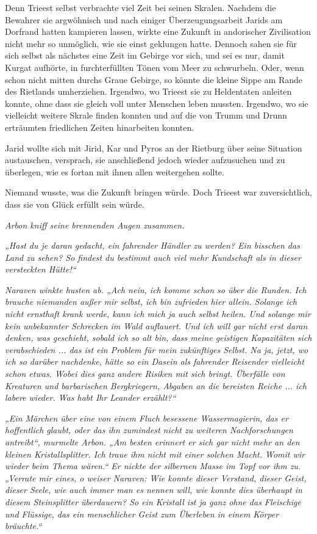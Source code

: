 Denn Trieest selbst verbrachte viel Zeit bei seinen Skralen. Nachdem die Bewahrer sie argwöhnisch und nach einiger Überzeugungsarbeit Jarids am Dorfrand hatten kampieren lassen, wirkte eine Zukunft in andorischer Zivilisation nicht mehr so unmöglich, wie sie einst geklungen hatte. Dennoch sahen sie für sich selbst als nächstes eine Zeit im Gebirge vor sich, und sei es nur, damit Kurgat aufhörte, in furchterfüllten Tönen vom Meer zu schwurbeln. Oder, wenn schon nicht mitten durchs Graue Gebirge, so könnte die kleine Sippe am Rande des Rietlands umherziehen. Irgendwo, wo Trieest sie zu Heldentaten anleiten konnte, ohne dass sie gleich voll unter Menschen leben mussten. Irgendwo, wo sie vielleicht weitere Skrale finden konnten und auf die von Trumm und Drunn erträumten friedlichen Zeiten hinarbeiten konnten.

Jarid wollte sich mit Jirid, Kar und Pyros an der Rietburg über seine Situation austauschen, versprach, sie anschließend jedoch wieder aufzusuchen und zu überlegen, wie es fortan mit ihnen allen weitergehen sollte.

Niemand wusste, was die Zukunft bringen würde. Doch Trieest war zuversichtlich, dass sie von Glück erfüllt sein würde.



\trennzeichen



\textit{Arbon kniff seine brennenden Augen zusammen.}

\textit{„Hast du je daran gedacht, ein fahrender Händler zu werden? Ein bisschen das Land zu sehen? So findest du bestimmt auch viel mehr Kundschaft als in dieser versteckten Hütte!“}

\textit{Naraven winkte husten ab. „Ach nein, ich komme schon so über die Runden. Ich brauche niemanden außer mir selbst, ich bin zufrieden hier allein. Solange ich nicht ernsthaft krank werde, kann ich mich ja auch selbst heilen. Und solange mir kein unbekannter Schrecken im Wald auflauert. Und ich will gar nicht erst daran denken, was geschieht, sobald ich so alt bin, dass meine geistigen Kapazitäten sich verabschieden ... das ist ein Problem für mein zukünftiges Selbst. Na ja, jetzt, wo ich so darüber nachdenke, hätte so ein Dasein als fahrender Reisender vielleicht schon etwas. Wobei dies ganz andere Risiken mit sich bringt. Überfälle von Kreaturen und barbarischen Bergkriegern, Abgaben an die bereisten Reiche ... ich labere wieder. Was habt Ihr Leander erzählt?“}

\textit{„Ein Märchen über eine von einem Fluch besessene Wassermagierin, das er hoffentlich glaubt, oder das ihn zumindest nicht zu weiteren Nachforschungen antreibt“, murmelte Arbon. „Am besten erinnert er sich gar nicht mehr an den kleinen Kristallsplitter. Ich traue ihm nicht mit einer solchen Macht. Womit wir wieder beim Thema wären.“ Er nickte der silbernen Masse im Topf vor ihm zu. „Verrate mir eines, o weiser Naraven: Wie konnte dieser Verstand, dieser Geist, dieser Seele, wie auch immer man es nennen will, wie konnte dies überhaupt in diesem Steinsplitter überdauern? So ein Kristall ist ja ganz ohne das Fleischige und Flüssige, das ein menschlicher Geist zum Überleben in einem Körper bräuchte.“}

